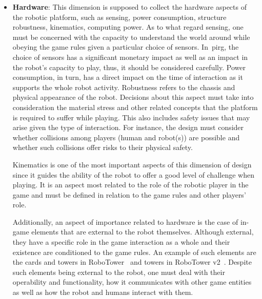 \begin{itemize}[leftmargin=*,labelsep=5.8mm]
\item \textbf{Hardware}: This dimension is supposed to collect the hardware aspects of the robotic platform, such as sensing, power consumption, structure robustness, kinematics, computing power. As to what regard sensing, one must be concerned with the capacity to understand the world around while obeying the game rules given a particular choice of sensors. In~\gls{pirg}, the choice of sensors has a significant monetary impact as well as an impact in the robot's capacity to play, thus, it should be considered carefully. Power consumption, in turn, has a direct impact on the time of interaction as it supports the whole robot activity. Robustness refers to the chassis and physical appearance of the robot. Decisions about this aspect must  take into consideration the material stress and other related concepts that the platform is required to suffer while playing. This also includes safety issues that may arise given the type of interaction. For instance, the design must consider whether collisions among players (human and robot(s)) are possible and whether such collisions offer risks to their physical safety. 

Kinematics is one of the most important aspects of this dimension of design since it guides the ability of the robot to offer a good level of challenge when playing. It is an aspect most related to the role of the robotic player in the game and must be defined in relation to the game rules and other players' role. 

Additionally,  an aspect of importance related to hardware is the case of in-game elements that are external to the robot themselves. Although external, they have a specific role in the game interaction as a whole and their existence are conditioned to the game rules. An example of such elements are the cards and towers in RoboTower~\citep{bonarini_timing_2014} and towers in RoboTower v2~\citep{oliveira_activity_2017}. Despite such elements being external to the robot, one must deal with their operability and functionality, how it communicates with other game entities as well as how the robot and humans interact with them.


\end{itemize}
